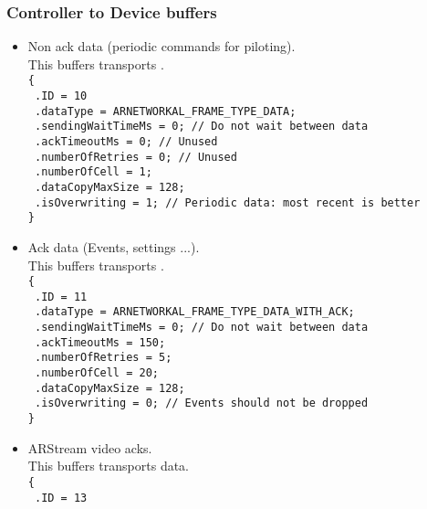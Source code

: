 \subsubsection*{Controller to Device buffers}
\begin{itemize}
\item{
    Non ack data (periodic commands for piloting).\\
    This buffers transports .\\
    \texttt{\{}\\
    \texttt{  .ID = 10}\\
    \texttt{  .dataType = ARNETWORKAL\_FRAME\_TYPE\_DATA;}\\
    \texttt{  .sendingWaitTimeMs = 0; // Do not wait between data}\\
    \texttt{  .ackTimeoutMs = 0; // Unused}\\
    \texttt{  .numberOfRetries = 0; // Unused}\\
    \texttt{  .numberOfCell = 1;}\\
    \texttt{  .dataCopyMaxSize = 128;}\\
    \texttt{  .isOverwriting = 1; // Periodic data: most recent is better}\\
    \texttt{\}}
}
\item{
    Ack data (Events, settings ...).\\
    This buffers transports .\\
    \texttt{\{}\\
    \texttt{  .ID = 11}\\
    \texttt{  .dataType = ARNETWORKAL\_FRAME\_TYPE\_DATA\_WITH\_ACK;}\\
    \texttt{  .sendingWaitTimeMs = 0; // Do not wait between data}\\
    \texttt{  .ackTimeoutMs = 150;}\\
    \texttt{  .numberOfRetries = 5;}\\
    \texttt{  .numberOfCell = 20;}\\
    \texttt{  .dataCopyMaxSize = 128;}\\
    \texttt{  .isOverwriting = 0; // Events should not be dropped}\\
    \texttt{\}}
}
\item{
    ARStream video acks.\\
    This buffers transports  data.\\
    \texttt{\{}\\
    \texttt{  .ID = 13}\\
}
\end{itemize}
